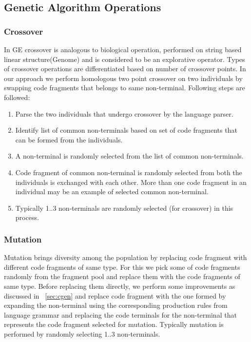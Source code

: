 \documentclass{sig-alternate}
\begin{document}
\subsection{Genetic Algorithm Operations}
\subsubsection{Crossover}
\indent In GE crossover is analogous to biological operation, performed on string based linear structure(Genome) and is considered to be an explorative operator. Types of crossover operations are differentiated based on number of crossover points. In our approach we perform  homologous two point crossover on two individuals by swapping code fragments that belongs to same non-terminal. Following steps are followed:
\begin{enumerate}
\item Parse the two individuals that undergo crossover by the language parser. \item Identify list of common non-terminals based on set of code fragments that can be formed from the individuals.
\item A non-terminal is randomly selected from the list of common non-terminals. 
\item Code fragment of common non-terminal is randomly selected from both the individuals is exchanged with each other. More than one code fragment in an individual may be an example of selected common non-terminal.
\item Typically 1..3 non-terminals are randomly selected (for crossover) in this process. 
\end{enumerate}

\subsubsection{Mutation}
\indent Mutation brings diversity among the population by replacing code fragment with different code fragments of same type. For this we pick some of code fragments randomly from the fragment pool and replace them with the code fragments of same type. Before replacing them directly, we perform some improvements as discussed in ~\autoref{sec:cgen} and replace code fragment with the one formed by expanding the non-terminal using the corresponding production rules from language grammar and replacing the code terminals for the non-terminal that represents the code fragment selected for mutation. Typically mutation is performed by randomly selecting 1..3 non-terminals.
\end{document}
